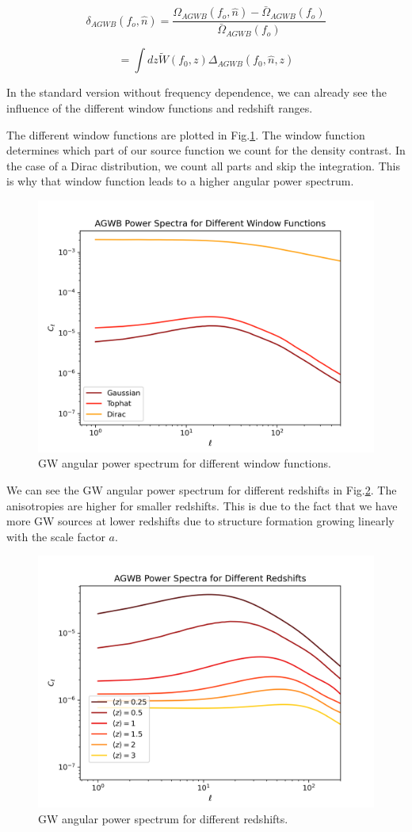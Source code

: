 \begin{equation}
    \delta_{AGWB}(f_o, \hat{n})=\frac{\Omega_{AGWB}(f_o, \hat{n})-\bar{\Omega}_{AGWB}(f_o)}{\bar{\Omega}_{AGWB}(f_o)}
\end{equation}

\begin{equation}
\label{window_fct_int}
    =\int dz \tilde{W}(f_0, z)\Delta_{AGWB}(f_0, \hat{n}, z)
\end{equation}


In the standard version without frequency dependence, we can already see the influence of the different window functions and redshift ranges.

The different window functions are plotted in Fig.\ref{plot_Cl_window_fct}. The window function determines which part of our source function we count for the density contrast. In the case of a Dirac distribution, we count all parts and skip the integration. This is why that window function leads to a higher angular power spectrum.\\
\begin{figure}[h]
 \centering
 \includegraphics[width=0.7\linewidth]{Images/diff_windows.png}
 \caption{GW angular power spectrum for different window functions.}
 \label{plot_Cl_window_fct}
\end{figure} 

We can see the GW angular power spectrum for different redshifts in Fig.\ref{plot_Cl_redshift}.
The anisotropies are higher for smaller redshifts. This is due to the fact that we have more GW sources at lower redshifts due to structure formation growing linearly with the scale factor $a$.

\begin{figure}[h]
 \centering
 \includegraphics[width=0.7\linewidth]{Images/diff_window_z.png}
 \caption{GW angular power spectrum for different redshifts.}
 \label{plot_Cl_redshift}
\end{figure} 

